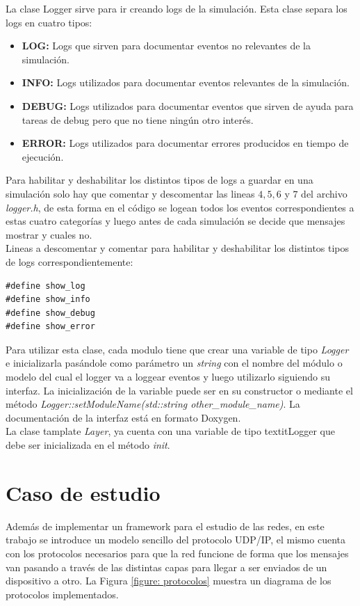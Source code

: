 \documentclass[10pt,a4paper]{article}
\begin{document}
La clase Logger sirve para ir creando logs de la simulación. Esta clase separa los logs en cuatro tipos:

\begin{itemize}
\item \textbf{LOG:} Logs que sirven para documentar eventos no relevantes de la simulación.
\item \textbf{INFO:} Logs utilizados para documentar eventos relevantes de la simulación.
\item \textbf{DEBUG:} Logs utilizados para documentar eventos que sirven de ayuda para tareas de debug pero que no tiene ningún otro interés.
\item \textbf{ERROR:} Logs utilizados para documentar errores producidos en tiempo de ejecución.
\end{itemize}

Para habilitar y deshabilitar los distintos tipos de logs a guardar en una simulación solo hay que comentar y descomentar las lineas $4,5,6$ y $7$ del archivo \textit{logger.h}, de esta forma en el código se logean todos los eventos correspondientes a estas cuatro categorías y luego antes de cada simulación se decide que mensajes mostrar y cuales no. \\

Lineas a descomentar y comentar para habilitar y deshabilitar los distintos tipos de logs correspondientemente:
\begin{lstlisting}
#define show_log
#define show_info
#define show_debug
#define show_error
\end{lstlisting}

Para utilizar esta clase, cada modulo tiene que crear una variable de tipo \textit{Logger} e inicializarla pasándole como parámetro un \textit{string} con el nombre del módulo o modelo del cual el logger va a loggear eventos y luego utilizarlo siguiendo su interfaz. La inicialización de la variable puede ser en su constructor o mediante el método \textit{Logger::setModuleName(std::string other\_module\_name)}. La documentación de la interfaz está en formato Doxygen. \\

La clase tamplate \textit{Layer}, ya cuenta con una variable de tipo textit{Logger} que debe ser inicializada en el método \textit{init}.

\section{Caso de estudio}
	Además de implementar un framework para el estudio de las redes, en este trabajo se introduce un modelo sencillo del protocolo UDP/IP, el mismo cuenta con los protocolos necesarios para que la red funcione de forma que los mensajes van pasando a través de las distintas capas para llegar a ser enviados de un dispositivo a otro. La Figura \ref{figure: protocolos} muestra un diagrama de los protocolos implementados. \\
\end{document}
